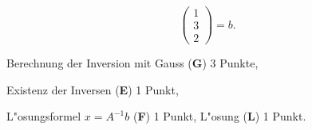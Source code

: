\begin{loesung}
\begin{teilaufgaben}
\[\begin{pmatrix}
1\\3\\2
\end{pmatrix}=b.
\]
\end{teilaufgaben}
\end{loesung}

\begin{bewertung}
\begin{teilaufgaben}
\item
Berechnung der Inversion mit Gauss ({\bf G}) 3 Punkte,
\item
Existenz der Inversen ({\bf E}) 1 Punkt,
\item
L"osungsformel $x=A^{-1}b$ ({\bf F}) 1 Punkt,
L"osung ({\bf L}) 1 Punkt.
\end{teilaufgaben}
\end{bewertung}
